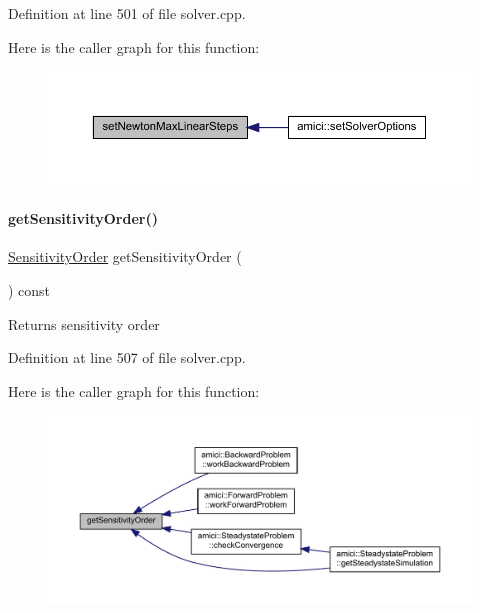 Definition at line 501 of file solver.\+cpp.

Here is the caller graph for this function\+:
\nopagebreak
\begin{figure}[H]
\begin{center}
\leavevmode
\includegraphics[width=350pt]{classamici_1_1_solver_af9143ab28630d5db394f641df0a8e477_icgraph}
\end{center}
\end{figure}
\mbox{\label{classamici_1_1_solver_affde3089fec2a1cca40d6cc0c4c2cf1d}} 
\paragraph{\texorpdfstring{get\+Sensitivity\+Order()}{getSensitivityOrder()}}
{\footnotesize\ttfamily \mbox{\hyperlink{namespaceamici_aaa03ec2f8c4d5323b98d71134a462fda}{Sensitivity\+Order}} get\+Sensitivity\+Order (\begin{DoxyParamCaption}{ }\end{DoxyParamCaption}) const}

\begin{DoxyReturn}{Returns}
sensitivity order 
\end{DoxyReturn}


Definition at line 507 of file solver.\+cpp.

Here is the caller graph for this function\+:
\nopagebreak
\begin{figure}[H]
\begin{center}
\leavevmode
\includegraphics[width=350pt]{classamici_1_1_solver_affde3089fec2a1cca40d6cc0c4c2cf1d_icgraph}
\end{center}
\end{figure}
\mbox{\label{classamici_1_1_solver_a26129f061fdf7869be2d3e4aa22532b6}} 
